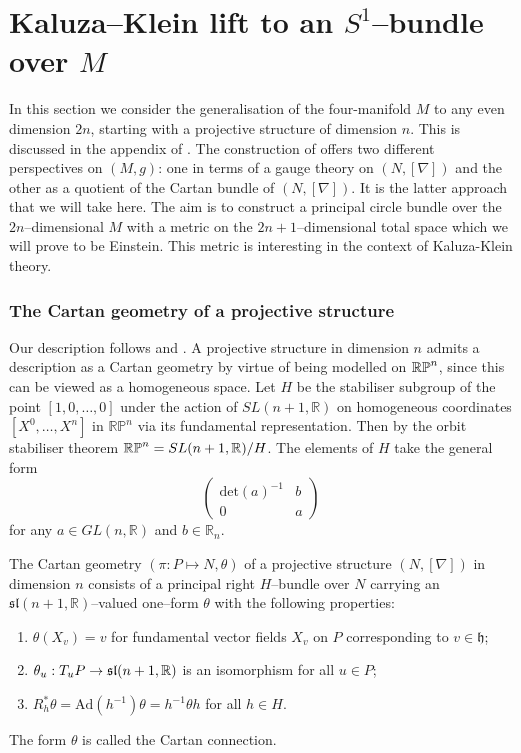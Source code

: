 
\chapter{Kaluza--Klein lift to an $S^1$--bundle over $M$}
\label{chap:KK_lift}
In this section we consider the generalisation of the four-manifold
$M$ to any even dimension $2n$, starting with a projective structure
of dimension $n$. This is discussed in the appendix of \cite{DM}. The construction
of \cite{DM} offers two different perspectives on $(M, g)$: one in terms of a gauge theory on $(N,[\nabla])$ and the other as a quotient of the Cartan bundle of $(N, [\nabla])$. It is the latter approach that we will take here. The aim is to construct a principal circle bundle over the $2n$--dimensional $M$ with a metric on the $2n+1$--dimensional total space which we will prove to be Einstein. This metric is interesting in the context of Kaluza-Klein theory.

\subsection{The Cartan geometry of a projective structure}
Our description follows \cite{Bryant} and \cite{DM}.
A projective structure in dimension $n$ admits a description as a Cartan geometry by virtue of being modelled on $\mathbb{RP}^n$, since this can be viewed as a homogeneous space. Let $H$ be the stabiliser subgroup of the point $[1,0,\dots,0]$
under the action of $SL(n+1,\mathbb{R})$ on homogeneous coordinates
$[X^{0},\dots,X^{n}]$ in $\mathbb{RP}^{n}$ via its fundamental representation. Then by the orbit stabiliser theorem $\mathbb{RP}^n=SL(n+1,\mathbb{R})/H$. The elements of $H$
take the general form
\[
\begin{pmatrix}\mathrm{det}(a)^{-1} & b\\
0 & a
\end{pmatrix}
\]
for any $a\in GL(n,\mathbb{R})$ and $b\in\mathbb{R}_{n}$.

\begin{defi}
The Cartan geometry $(\pi:P\mapsto N,\theta)$ of a projective structure $(N,[\nabla])$ in dimension $n$ consists of a principal right $H$--bundle over $N$ carrying an $\mathfrak{sl}(n+1,\mathbb{R})$--valued one--form $\theta$ with the following properties:
\begin{enumerate}
\item{$\theta(X_v)=v$ for fundamental vector fields $X_v$ on $P$ corresponding to $v\in\mathfrak{h}$;}
\item{$\theta_u:T_uP\rightarrow\mathfrak{sl}(n+1,\mathbb{R})$ is an isomorphism for all $u\in P$;}
\item{$R^{*}_h\theta=\mathrm{Ad}(h^{-1})\theta=h^{-1}\theta h$ for all $h\in H$.}
\end{enumerate}
The form $\theta$ is called the Cartan connection.
\end{defi}

